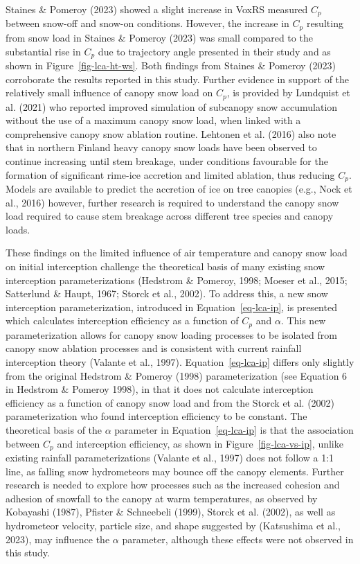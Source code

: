 \documentclass[
  letterpaper,
  DIV=11,
  numbers=noendperiod]{scrartcl}
\begin{document}
Staines \& Pomeroy (2023) showed a slight increase in VoxRS measured
\(C_p\) between snow-off and snow-on conditions. However, the increase
in \(C_p\) resulting from snow load in Staines \& Pomeroy (2023) was
small compared to the substantial rise in \(C_p\) due to trajectory
angle presented in their study and as shown in
Figure~\ref{fig-lca-ht-ws}. Both findings from Staines \& Pomeroy (2023)
corroborate the results reported in this study. Further evidence in
support of the relatively small influence of canopy snow load on
\(C_p\), is provided by Lundquist et al. (2021) who reported improved
simulation of subcanopy snow accumulation without the use of a maximum
canopy snow load, when linked with a comprehensive canopy snow ablation
routine. Lehtonen et al. (2016) also note that in northern Finland heavy
canopy snow loads have been observed to continue increasing until stem
breakage, under conditions favourable for the formation of significant
rime-ice accretion and limited ablation, thus reducing \(C_p\). Models
are available to predict the accretion of ice on tree canopies (e.g.,
Nock et al., 2016) however, further research is required to understand
the canopy snow load required to cause stem breakage across different
tree species and canopy loads.

These findings on the limited influence of air temperature and canopy
snow load on initial interception challenge the theoretical basis of
many existing snow interception parameterizations (Hedstrom \& Pomeroy,
1998; Moeser et al., 2015; Satterlund \& Haupt, 1967; Storck et al.,
2002). To address this, a new snow interception parameterization,
introduced in Equation~\ref{eq-lca-ip}, is presented which calculates
interception efficiency as a function of \(C_p\) and \(\alpha\). This
new parameterization allows for canopy snow loading processes to be
isolated from canopy snow ablation processes and is consistent with
current rainfall interception theory (Valante et al., 1997).
Equation~\ref{eq-lca-ip} differs only slightly from the original
Hedstrom \& Pomeroy (1998) parameterization (see Equation 6 in Hedstrom
\& Pomeroy 1998), in that it does not calculate interception efficiency
as a function of canopy snow load and from the Storck et al. (2002)
parameterization who found interception efficiency to be constant. The
theoretical basis of the \(\alpha\) parameter in
Equation~\ref{eq-lca-ip} is that the association between \(C_p\) and
interception efficiency, as shown in Figure~\ref{fig-lca-vs-ip}, unlike
existing rainfall parameterizations (Valante et al., 1997) does not
follow a 1:1 line, as falling snow hydrometeors may bounce off the
canopy elements. Further research is needed to explore how processes
such as the increased cohesion and adhesion of snowfall to the canopy at
warm temperatures, as observed by Kobayashi (1987), Pfister \&
Schneebeli (1999), Storck et al. (2002), as well as hydrometeor
velocity, particle size, and shape suggested by (Katsushima et al.,
2023), may influence the \(\alpha\) parameter, although these effects
were not observed in this study.
\end{document}
